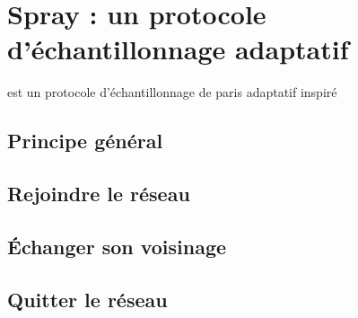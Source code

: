 
\section{Spray : un protocole d'échantillonnage adaptatif}

\SPRAY est un protocole d'échantillonnage de paris adaptatif inspiré 

\subsection{Principe général}

\subsection{Rejoindre le réseau}

\subsection{Échanger son voisinage}

\subsection{Quitter le réseau}

